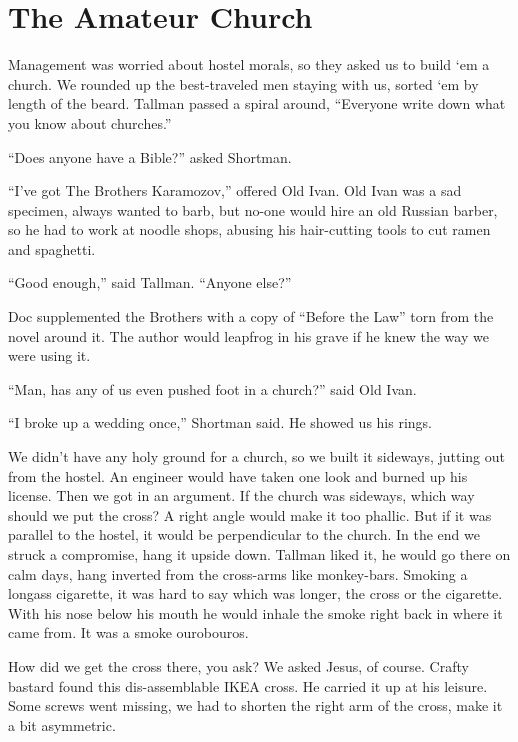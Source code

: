 \documentclass[oneside]{book}
\begin{document}
\chapter{The Amateur Church}

Management was worried about hostel morals, so they asked us to build `em a church.
We rounded up the best-traveled men staying with us, sorted `em by length of the beard.
Tallman passed a spiral around,
``Everyone write down what you know about churches.''

``Does anyone have a Bible?'' asked Shortman.

``I've got The Brothers Karamozov,'' offered Old Ivan.  Old Ivan was a sad specimen,
always wanted to barb, but no-one would hire an old Russian barber, so he had to work at noodle shops, abusing his
hair-cutting tools to cut ramen and spaghetti.

``Good enough,'' said Tallman.  ``Anyone else?''


Doc supplemented the Brothers with a copy of ``Before the Law'' torn from the novel around it.  
The author would leapfrog in his grave if he knew the way we were using it.

``Man, has any of us even pushed foot in a church?'' said Old Ivan.

``I broke up a wedding once,'' Shortman said.  He showed us his rings.

We didn't have any holy ground for a church, so we built it sideways, jutting out from the hostel.
An engineer would have taken one look and burned up his license.
Then we got in an argument.  If the church was sideways, which way should we put the cross?
A right angle would make it too phallic.  But if it was parallel to the hostel, it would be perpendicular
to the church.  In the end we struck a compromise, hang it upside down.
Tallman liked it, he would go there on calm days, hang inverted from the cross-arms like monkey-bars.
Smoking a longass cigarette, it was hard to say which was longer, the cross or the cigarette.
With his nose below his mouth he would inhale the smoke right back in where it came from.
It was a smoke ourobouros.

How did we get the cross there, you ask?  We asked Jesus, of course.  Crafty bastard found this dis-assemblable
IKEA cross.  He carried it up at his leisure.  Some screws went missing, we had to shorten the
right arm of the cross, make it a bit asymmetric.
\end{document}
